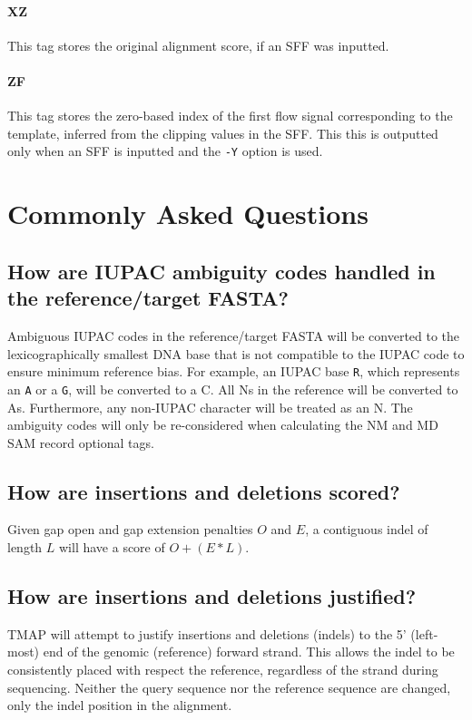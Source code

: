\documentclass[a4paper,12pt]{book}
\newcommand{\TT}[1]{{\tt #1}} %
\begin{document}
\subsubsection{XZ}
This tag stores the original alignment score, if an SFF was inputted.


\subsubsection{ZF}
This tag stores the zero-based index of the first flow signal corresponding to the template, inferred from the clipping values in the SFF.
This this is outputted only when an SFF is inputted and the \TT{-Y} option is used.

\chapter{Commonly Asked Questions}
\label{chap:faq}

\mtcaddchapter 
\minitoc

\section{How are IUPAC ambiguity codes handled in the reference/target FASTA?}
\label{sec:iupac}
Ambiguous IUPAC codes in the reference/target FASTA will be converted to the lexicographically smallest DNA base that is not compatible to the IUPAC code to ensure minimum reference bias.
For example, an IUPAC base \TT{R}, which represents an \TT{A} or a \TT{G}, will be converted to a C.
All Ns in the reference will be converted to As.
Furthermore, any non-IUPAC character will be treated as an N.
The ambiguity codes will only be re-considered when calculating the NM and MD SAM record optional tags.

\section{How are insertions and deletions scored?}
\label{sec:indel-scoring}
Given gap open and gap extension penalties $O$ and $E$, a contiguous indel of length $L$ will have a score of $O + (E * L)$.

\section{How are insertions and deletions justified?}
\label{sec:indel-justification}
TMAP will attempt to justify insertions and deletions (indels) to the 5' (left-most) end of the genomic (reference) forward strand.
This allows the indel to be consistently placed with respect the reference, regardless of the strand during sequencing.
Neither the query sequence nor the reference sequence are changed, only the indel position in the alignment.
\end{document}
